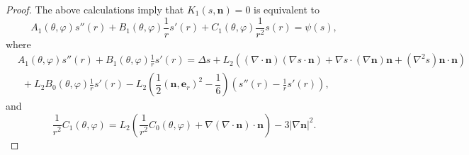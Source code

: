 \documentclass[10pt, a4paper]{article}
\newcommand\n{\mathbf{n}}
\newcommand\e{\mathbf{e}}
\begin{document}
\begin{proof}
The above calculations imply that $K_1 (s, \n) = 0$ is equivalent to
\begin{equation}\label{AE_P1_s}
A_1(\theta, \varphi) s''(r) + B_1(\theta, \varphi) \frac{1}{r} s'(r) + C_1(\theta, \varphi) \frac{1}{r^2} s(r) = \psi (s),
\end{equation}
where
\begin{equation}\label{AE_P1_AB}
\begin{aligned}
& A_1(\theta, \varphi) s''(r) + B_1(\theta, \varphi) \frac{1}{r} s'(r) =  \Delta s + L_2 \left( (\nabla \cdot \n) (\nabla s \cdot \n) + \nabla s \cdot (\nabla \n) \n + (\nabla^2 s) \n \cdot \n \right)  \\
&  ~~ + L_2 B_0 (\theta, \varphi)  \frac{1}{r} s'(r) - L_2 \left( \dfrac{1}{2} (\n, \e_r)^2 - \dfrac{1}{6} \right) \left( s''(r) - \frac{1}{r} s'(r) \right),
\end{aligned}
\end{equation}
and
\begin{equation}
 \frac{1}{r^2}C_1(\theta, \varphi) =  L_2 \left( \frac{1}{r^2}C_0(\theta, \varphi) + \nabla (\nabla \cdot \n) \cdot \n \right) - 3 |\nabla \n|^2.
\end{equation}


\end{proof}
\end{document}
